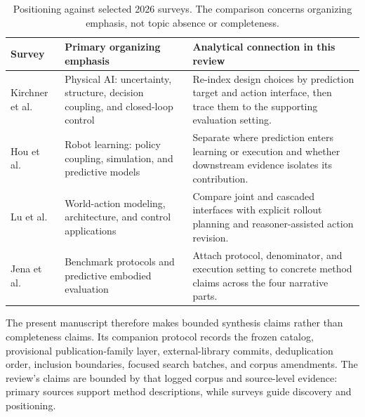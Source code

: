 \begin{table}[t]
\caption{Positioning against selected 2026 surveys. The comparison concerns organizing emphasis, not topic absence or completeness.}
\label{tab:survey-position}
\small
\begin{tabularx}{\linewidth}{@{}>{\raggedright\arraybackslash}p{.20\linewidth}YY@{}}
\toprule
Survey & Primary organizing emphasis & Analytical connection in this review \\
\midrule
Kirchner et al.~\cite{kirchner2026physicalai} & Physical AI: uncertainty, structure, decision coupling, and closed-loop control & Re-index design choices by prediction target and action interface, then trace them to the supporting evaluation setting. \\
\addlinespace
Hou et al.~\cite{hou2026survey} & Robot learning: policy coupling, simulation, and predictive models & Separate where prediction enters learning or execution and whether downstream evidence isolates its contribution. \\
\addlinespace
Lu et al.~\cite{lu2026survey} & World-action modeling, architecture, and control applications & Compare joint and cascaded interfaces with explicit rollout planning and reasoner-assisted action revision. \\
\addlinespace
Jena et al.~\cite{jena2026evaluation} & Benchmark protocols and predictive embodied evaluation & Attach protocol, denominator, and execution setting to concrete method claims across the four narrative parts. \\
\bottomrule
\end{tabularx}
\end{table}

The present manuscript therefore makes bounded synthesis claims rather than completeness claims. Its companion protocol records the frozen catalog, provisional publication-family layer, external-library commits, deduplication order, inclusion boundaries, focused search batches, and corpus amendments. The review's claims are bounded by that logged corpus and source-level evidence: primary sources support method descriptions, while surveys guide discovery and positioning.
